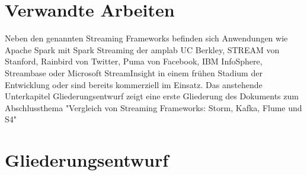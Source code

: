 \documentclass[11pt, a4paper]{book}
\begin{document}
\section{Verwandte Arbeiten}
Neben den genannten Streaming Frameworks befinden sich Anwendungen wie Apache Spark mit Spark Streaming der amplab UC Berkley, STREAM von Stanford, Rainbird von Twitter, Puma von Facebook, IBM InfoSphere, Streambase oder Microsoft StreamInsight in einem frühen Stadium der Entwicklung oder sind bereits kommerziell im Einsatz.  Das anstehende Unterkapitel Gliederungsentwurf zeigt eine erste Gliederung des Dokuments zum Abschlussthema "Vergleich von Streaming Frameworks: Storm, Kafka, Flume und S4"


\section{Gliederungsentwurf}
\end{document}
